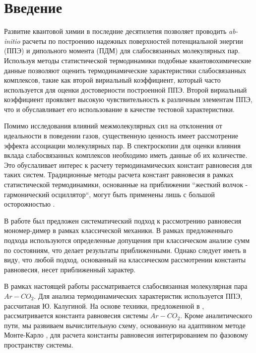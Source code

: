 \section{Введение}
Развитие квантовой химии в последние десятилетия позволяет проводить \textit{ab-initio} расчеты по построению надежных поверхностей потенциальной энергии (ППЭ) и дипольного момента (ПДМ) для слабосвязанных молекулярных пар. Используя методы статистической термодинамики подобные квантовохимические данные позволяют оценить термодинамические характеристики слабосвязанных комплексов, такие как второй вириальный коэффициент, который часто используется для оценки достоверности построенной ППЭ. Второй вириальный коэффициент проявляет высокую чувствительность к различным элементам ППЭ, что и обуславливает его использование в качестве тестовой характеристики. \par
 Помимо исследования влияний межмолекулярных сил на отклонения от идеальности в поведении газов, существенную ценность имеет рассмотрение эффекта ассоциации молекулярных пар. В спектроскопии для оценки влияния вклада слабосвязанных комплексов необходимо иметь данные об их количестве. Это обуслаливает интерес к расчету термодинамических констант равновесия для таких систем. Традиционные методы расчета констант равновесия в рамках статистической термодинамики, основанные на приближении ``жесткий волчок - гармонический осциллятор``, могут быть применены лишь с большой осторожностью \cite{camyvigasin}. \par
В работе \cite{vigasin2015} был предложен систематический подход к рассмотрению равновесия мономер-димер в рамках классической механики. В рамках предложенныго подхода используются определенные допущения при классическом анализе сумм по состояниям, что делает результаты приближенными. Однако следует иметь в виду, что любой подход, основанный на классическом рассмотрении константы равновесия, несет приближенный характер. \par
В рамках настоящей работы рассматривается слабосвязанная молекулярная пара $Ar-CO_2$. Для анализа термодинамических характеристик используется ППЭ, рассчитаная Ю. Калугиной. На основе техники, предложенной в \cite{vigasin2015}, рассматривается константа равновесия системы $Ar-CO_2$. Кроме аналитического пути, мы развиваем вычислительную схему, основанную на адаптивном методе Монте-Карло \cite{lepage1978, vegas}, для расчета константы равновесия интегрированием по фазовому пространству системы. 
